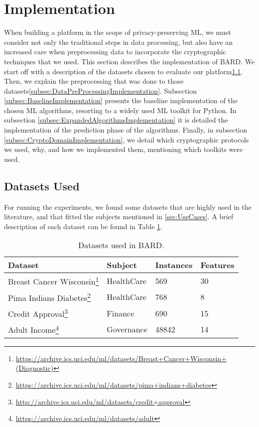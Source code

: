 
\section{Implementation}
\label{sec:Implementation}

When building a platform in the scope of privacy-preserving \ac{ML}, we must consider not only the traditional steps in data processing, but also have an increased care when preprocessing data to incorporate the cryptographic techniques that we used.
This section describes the implementation of \ac{BARD}. We start off with a description of the datasets chosen to evaluate our platform\ref{subsec:DatasetsImplementation}. Then, we explain the preprocessing that was done to those datasets\ref{subsec:DataPreProcessingImplementation}.
Subsection \ref{subsec:BaselineImplementation} presents the baseline implementation of the chosen \ac{ML} algorithms, resorting to a widely used \ac{ML} toolkit for Python.
In subsection \ref{subsec:ExpandedAlgorithmsImplementation} it is detailed the implementation of the prediction phase of the algorithms.
Finally, in subsection \ref{subsec:CryptoDomainImplementation}, we detail which cryptographic protocols we used, why, and how we implemented them, mentioning which toolkits were used.



\subsection{Datasets Used}
\label{subsec:DatasetsImplementation}

For running the experiments, we found some datasets that are highly used in the literature, and that fitted the subjects mentioned in \ref{sec:UseCases}. A brief description of each dataset can be found in Table \ref{table:datasets}.

\begin{table}[H]
\centering
\caption{Datasets used in \ac{BARD}.}
\label{table:datasets}
\begin{tabular}{|l|l|l|l|}
\hline
\textbf{Dataset} & \textbf{Subject} & \textbf{Instances} & \textbf{Features} \\ \hline
 Breast Cancer Wisconsin\footnote{\url{https://archive.ics.uci.edu/ml/datasets/Breast+Cancer+Wisconsin+(Diagnostic)}}  &  HealthCare  & 569    & 30       \\ \hline
 Pima Indians Diabetes\footnote{\url{https://archive.ics.uci.edu/ml/datasets/pima+indians+diabetes}}    &  HealthCare  & 768    &  8       \\ \hline
 Credit Approval\footnote{\url{http://archive.ics.uci.edu/ml/datasets/credit+approval}}          &  Finance     & 690    & 15       \\ \hline
 Adult Income\footnote{\url{https://archive.ics.uci.edu/ml/datasets/adult}}             &  Governance  & 48842  & 14       \\ \hline 
\end{tabular}
\end{table}

